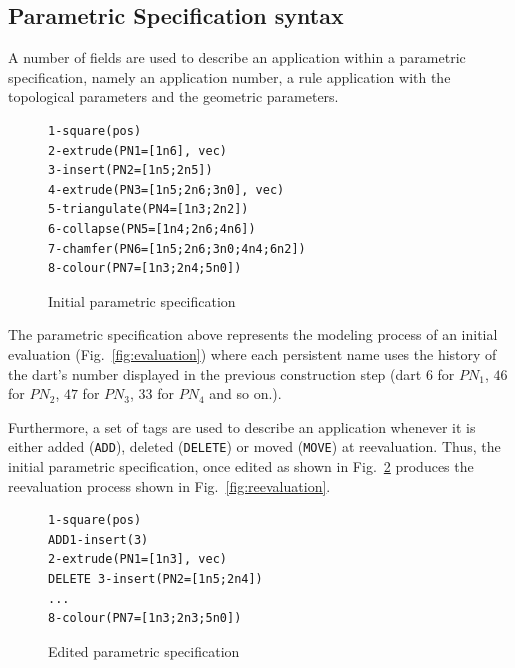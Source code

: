 \subsection{Parametric Specification syntax}


A number of fields are used to describe an application within a parametric
specification, namely an application number, a rule ap\-pli\-ca\-tion with 
the topological pa\-ra\-me\-ters and the geometric parameters. %
%
\begin{figure}
    \centering
\begin{verbatim}
1-square(pos)
2-extrude(PN1=[1n6], vec)
3-insert(PN2=[1n5;2n5])
4-extrude(PN3=[1n5;2n6;3n0], vec)
5-triangulate(PN4=[1n3;2n2])
6-collapse(PN5=[1n4;2n6;4n6])
7-chamfer(PN6=[1n5;2n6;3n0;4n4;6n2])
8-colour(PN7=[1n3;2n4;5n0])
\end{verbatim}
    \caption{Initial parametric specification}
    \label{fig:init-spec}
\end{figure}
%
The parametric specification above represents the modeling process of an
initial evaluation (Fig.~\ref{fig:evaluation}) where each persistent name 
uses the history of the dart's number displayed in the previous construction
step (dart $6$ for $PN_1$, $46$ for $PN_2$, $47$ for $PN_3$, $33$ for $PN_4$
and so on.). %

Furthermore, a set of tags are used to describe an application whenever it is either
added (\texttt{ADD}), deleted (\texttt{DELETE}) or moved (\texttt{MOVE}) at
reevaluation. %
Thus, the initial parametric specification, once edited as %
shown in Fig.~\ref{fig:reval-spec}
produces the
reevaluation process 
shown in Fig.~\ref{fig:reevaluation}.
%
\begin{figure}
    \centering
\begin{verbatim}
1-square(pos)
ADD1-insert(3)
2-extrude(PN1=[1n3], vec)
DELETE 3-insert(PN2=[1n5;2n4])
...
8-colour(PN7=[1n3;2n3;5n0])
\end{verbatim}
    \caption{Edited parametric specification}
    \label{fig:reval-spec}
\end{figure}